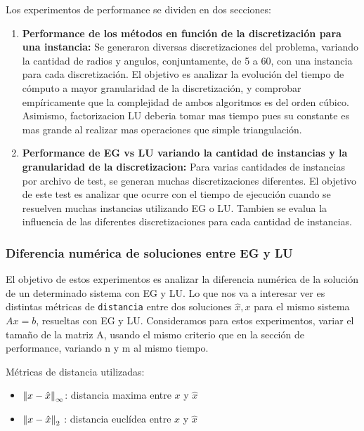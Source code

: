 Los experimentos de performance se dividen en dos secciones:

\begin{enumerate}

\item \textbf {Performance de los m\'etodos en funci\'on de la discretizaci\'on para una instancia:}  Se generaron diversas discretizaciones del problema, variando la cantidad de radios y angulos, conjuntamente, de 5 a 60, con una instancia para cada discretizaci\'on. El objetivo es analizar la evoluci\'on del tiempo de c\'omputo a mayor granularidad de la discretizaci\'on, y comprobar emp\'iricamente que la complejidad de ambos algoritmos es del orden c\'ubico. Asimismo, factorizacion LU deberia tomar mas tiempo pues su constante es mas grande al realizar mas operaciones que simple triangulación.

\item \textbf{Performance de EG vs LU variando la cantidad de instancias y la granularidad de la discretizacion: } Para varias cantidades de instancias por archivo de test, se generan muchas discretizaciones diferentes. El objetivo de este test es analizar que ocurre con el tiempo de ejecución cuando se resuelven muchas instancias utilizando EG o LU. Tambien se evalua la influencia de las diferentes discretizaciones para cada cantidad de instancias.

\end{enumerate}

\subsubsection{Diferencia numérica de soluciones entre EG y LU}
El objetivo de estos experimentos es analizar la diferencia numérica de la solución de un determinado sistema con EG y LU. Lo que nos va a interesar ver es distintas métricas de \texttt{distancia} entre dos soluciones $\hat{x} , x$ para el mismo sistema $Ax=b$, resueltas con EG y LU. Consideramos para estos experimentos, variar el tamaño de la matriz A, usando el mismo criterio que en la sección de performance, variando n y m al mismo tiempo.

\vspace{0.3cm}

Métricas de distancia utilizadas:
\begin{itemize}
    \item $\left\lVert x - \hat{x} \right\rVert_\infty$: distancia maxima entre $x$ y $\hat{x}$
    \item $\left\lVert x - \hat{x} \right\rVert_2$ : distancia euclídea entre $x$ y $\hat{x}$
\end{itemize}

